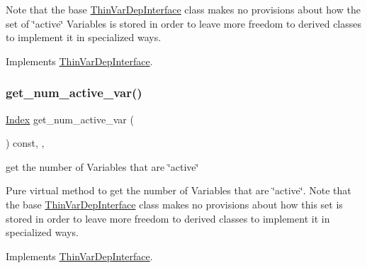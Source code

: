 Note that the base \mbox{\hyperlink{class_s_m_spp__di__unipi__it_1_1_thin_var_dep_interface}{Thin\+Var\+Dep\+Interface}} class makes no provisions about how the set of \char`\"{}active\char`\"{} Variables is stored in order to leave more freedom to derived classes to implement it in specialized ways. 

Implements \mbox{\hyperlink{group___thin_var_dep_interface___c_l_a_s_s_e_s_ga1967518603f9424434460d4ba8676c37}{Thin\+Var\+Dep\+Interface}}.

\mbox{\label{class_s_m_spp__di__unipi__it_1_1_one_var_constraint_acc8ac3c57cc2c71ac3fe6c409fe53074}} 
\subsubsection{\texorpdfstring{get\+\_\+num\+\_\+active\+\_\+var()}{get\_num\_active\_var()}}
{\footnotesize\ttfamily \mbox{\hyperlink{group___thin_var_dep_interface___c_l_a_s_s_e_s_gad53d6229d7ec28555a9c9c2fd9abf773}{Index}} get\+\_\+num\+\_\+active\+\_\+var (\begin{DoxyParamCaption}\item[{void}]{ }\end{DoxyParamCaption}) const\hspace{0.3cm}{\ttfamily [inline]}, {\ttfamily [override]}, {\ttfamily [virtual]}}



get the number of Variables that are \char`\"{}active\char`\"{} 

Pure virtual method to get the number of Variables that are \char`\"{}active\char`\"{}. Note that the base \mbox{\hyperlink{class_s_m_spp__di__unipi__it_1_1_thin_var_dep_interface}{Thin\+Var\+Dep\+Interface}} class makes no provisions about how this set is stored in order to leave more freedom to derived classes to implement it in specialized ways. 

Implements \mbox{\hyperlink{group___thin_var_dep_interface___c_l_a_s_s_e_s_ga6dbf09c17736b358d11f617e15856981}{Thin\+Var\+Dep\+Interface}}.


